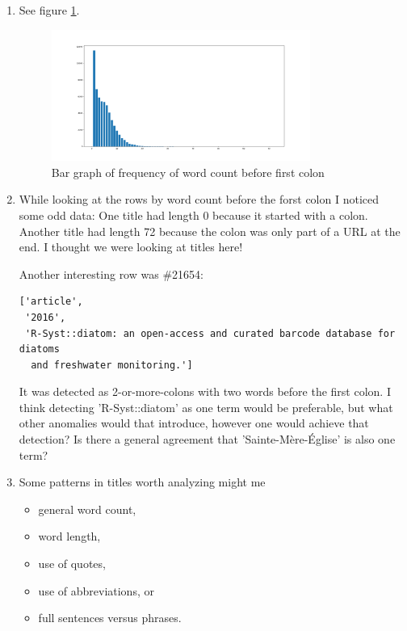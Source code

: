 \documentclass[10pt,a4paper]{article}
\begin{document}
\begin{enumerate}
    \item See figure \ref{fig:3}.
    \begin{figure}[h!]
        \centering
        \includegraphics[width=0.8\textwidth]{Figure_3.png}
        \caption{Bar graph of frequency of word count before first colon}
        \label{fig:3}
    \end{figure}
    
    \item While looking at the rows by word count before the forst colon I noticed some odd data: One title had length 0 because it started with a colon. Another title had length 72 because the colon was only part of a URL at the end. I thought we were looking at titles here!
    
    Another interesting row was \#21654:
    \begin{verbatim}
['article',
 '2016',
 'R-Syst::diatom: an open-access and curated barcode database for diatoms
  and freshwater monitoring.']\end{verbatim}
    It was detected as 2-or-more-colons with two words before the first colon. I think detecting 'R-Syst::diatom' as one term would be preferable, but what other anomalies would that introduce, however one would achieve that detection? Is there a general agreement that 'Sainte-Mère-Église' is also one term?
    
    \item Some patterns in titles worth analyzing might me
    \begin{itemize}
        \item general word count,
        \item word length,
        \item use of quotes,
        \item use of abbreviations, or
        \item full sentences versus phrases.
    \end{itemize}
    
\end{enumerate}
\end{document}
